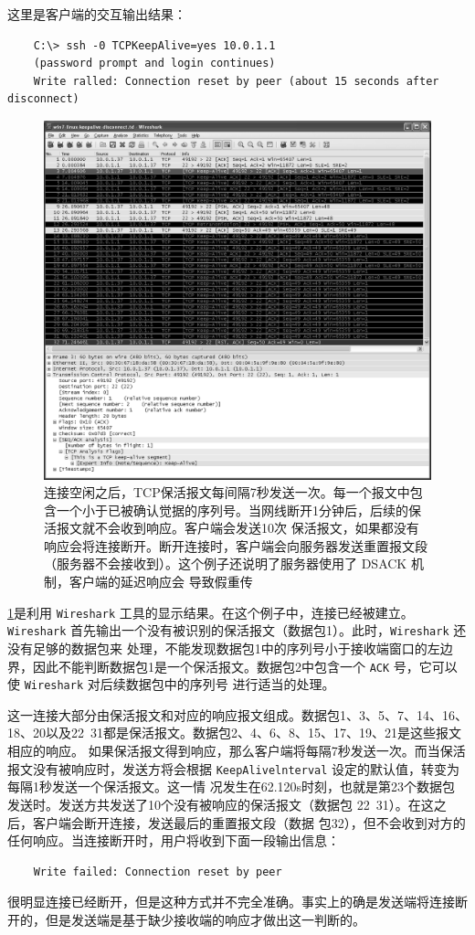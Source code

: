 这里是客户端的交互输出结果：
\begin{verbatim}
    C:\> ssh -0 TCPKeepAlive=yes 10.0.1.1
    (password prompt and login continues)
    Write ralled: Connection reset by peer (about 15 seconds after disconnect)
\end{verbatim}

\begin{figure}[!htb]
    \centering
	\includegraphics[width=1\textwidth]{imgs/17/17-1.png}
	\caption{连接空闲之后，TCP保活报文每间隔7秒发送一次。每一个报文中包含一个小于已被确认觉据的序列号。当网线断开1分钟后，后续的保活报文就不会收到响应。客户端会发送10次
    保活报文，如果都没有响应会将连接断开。断开连接时，客户端会向服务器发送重置报文段（服务器不会接收到）。这个例子还说明了服务器使用了 DSACK 机制，客户端的延迟响应会
    导致假重传}
    \label{fig:17-1}
\end{figure}

\ref{fig:17-1}是利用 \verb|Wireshark| 工具的显示结果。在这个例子中，连接已经被建立。\verb|Wireshark| 首先输出一个没有被识别的保活报文（数据包1）。此时，\verb|Wireshark| 还没有足够的数据包来
处理，不能发现数据包1中的序列号小于接收端窗口的左边界，因此不能判断数据包1是一个保活报文。数据包2中包含一个 \verb|ACK| 号，它可以使 \verb|Wireshark| 对后续数据包中的序列号
进行适当的处理。

这一连接大部分由保活报文和对应的响应报文组成。数据包1、3、5、7、14、16、18、20以及22~31都是保活报文。数据包2、4、6、8、15、17、19、21是这些报文相应的响应。
如果保活报文得到响应，那么客户端将每隔7秒发送一次。而当保活报文没有被响应时，发送方将会根据 \verb|KeepAlivelnterval| 设定的默认值，转变为每隔1秒发送一个保活报文。这一情
况发生在62.120s时刻，也就是第23个数据包发送时。发送方共发送了10个没有被响应的保活报文（数据包 22~31）。在这之后，客户端会断开连接，发送最后的重置报文段（数据
包32），但不会收到对方的任何响应。当连接断开时，用户将收到下面一段输出信息：
\begin{verbatim}
    Write failed: Connection reset by peer
\end{verbatim}
很明显连接已经断开，但是这种方式并不完全准确。事实上的确是发送端将连接断开的，但是发送端是基于缺少接收端的响应才做出这一判断的。

